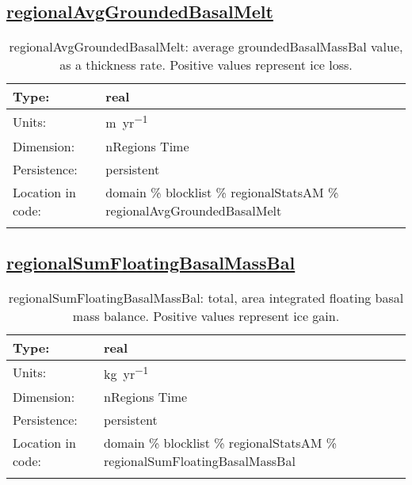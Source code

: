\subsection[regionalAvgGroundedBasalMelt]{\hyperref[sec:var_tab_regionalStatsAM]{regionalAvgGroundedBasalMelt}}
\label{subsec:var_sec_regionalStatsAM_regionalAvgGroundedBasalMelt}
\begin{center}
\begin{longtable}{| p{2.0in} | p{4.0in} |}
        \hline 
        Type: & real \\
        \hline 
        Units: & \si{m.yr^{-1}} \\
        \hline 
        Dimension: & nRegions Time \\
        \hline 
        Persistence: & persistent \\
        \hline 
         Location in code: & domain \% blocklist \% regionalStatsAM \% regionalAvgGroundedBasalMelt \\
         \hline 
    \caption{regionalAvgGroundedBasalMelt: average groundedBasalMassBal value, as a thickness rate. Positive values represent ice loss.}
\end{longtable}
\end{center}
\subsection[regionalSumFloatingBasalMassBal]{\hyperref[sec:var_tab_regionalStatsAM]{regionalSumFloatingBasalMassBal}}
\label{subsec:var_sec_regionalStatsAM_regionalSumFloatingBasalMassBal}
\begin{center}
\begin{longtable}{| p{2.0in} | p{4.0in} |}
        \hline 
        Type: & real \\
        \hline 
        Units: & \si{kg.yr^{-1}} \\
        \hline 
        Dimension: & nRegions Time \\
        \hline 
        Persistence: & persistent \\
        \hline 
         Location in code: & domain \% blocklist \% regionalStatsAM \% regionalSumFloatingBasalMassBal \\
         \hline 
    \caption{regionalSumFloatingBasalMassBal: total, area integrated floating basal mass balance. Positive values represent ice gain.}
\end{longtable}
\end{center}
